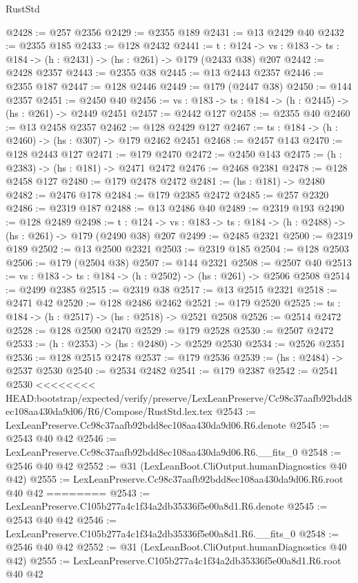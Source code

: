 \begin{lexlean}{RustStd}
\begin{coremodule}
{\begin{coremodule}
{{{{{@2428 := @257 @2356
@2429 := @2355 @189
@2431 := @13 @2429 @40
@2432 := @2355 @185
@2433 := @128 @2432
@2441 := {t : @124} ->
  {vs : @183} -> {ts : @184} -> (h : @2431) -> (hs : @261) -> @179 (@2433 @38) @207
@2442 := @2428 @2357
@2443 := @2355 @38
@2445 := @13 @2443 @2357
@2446 := @2355 @187
@2447 := @128 @2446
@2449 := @179 (@2447 @38)
@2450 := @144 @2357
@2451 := @2450 @40
@2456 := {vs : @183} -> {ts : @184} -> (h : @2445) -> (hs : @261) -> @2449 @2451
@2457 := @2442 @127
@2458 := @2355 @40
@2460 := @13 @2458 @2357
@2462 := @128 @2429 @127
@2467 := {ts : @184} -> (h : @2460) -> (hs : @307) -> @179 @2462 @2451
@2468 := @2457 @143
@2470 := @128 @2443 @127
@2471 := @179 @2470
@2472 := @2450 @143
@2475 := (h : @2383) -> (hs : @181) -> @2471 @2472
@2476 := @2468 @2381
@2478 := @128 @2458 @127
@2480 := @179 @2478 @2472
@2481 := (hs : @181) -> @2480
@2482 := @2476 @178
@2484 := @179 @2385 @2472
@2485 := @257 @2320
@2486 := @2319 @187
@2488 := @13 @2486 @40
@2489 := @2319 @193
@2490 := @128 @2489
@2498 := {t : @124} ->
  {vs : @183} -> {ts : @184} -> (h : @2488) -> (hs : @261) -> @179 (@2490 @38) @207
@2499 := @2485 @2321
@2500 := @2319 @189
@2502 := @13 @2500 @2321
@2503 := @2319 @185
@2504 := @128 @2503
@2506 := @179 (@2504 @38)
@2507 := @144 @2321
@2508 := @2507 @40
@2513 := {vs : @183} -> {ts : @184} -> (h : @2502) -> (hs : @261) -> @2506 @2508
@2514 := @2499 @2385
@2515 := @2319 @38
@2517 := @13 @2515 @2321
@2518 := @2471 @42
@2520 := @128 @2486 @2462
@2521 := @179 @2520
@2525 := {ts : @184} -> (h : @2517) -> (hs : @2518) -> @2521 @2508
@2526 := @2514 @2472
@2528 := @128 @2500 @2470
@2529 := @179 @2528
@2530 := @2507 @2472
@2533 := (h : @2353) -> (hs : @2480) -> @2529 @2530
@2534 := @2526 @2351
@2536 := @128 @2515 @2478
@2537 := @179 @2536
@2539 := (hs : @2484) -> @2537 @2530
@2540 := @2534 @2482
@2541 := @179 @2387
@2542 := @2541 @2530
<<<<<<<< HEAD:bootstrap/expected/verify/preserve/LexLeanPreserve/Cc98c37aafb92bdd8ec108aa430da9d06/R6/Compose/RustStd.lex.tex
@2543 := LexLeanPreserve.Cc98c37aafb92bdd8ec108aa430da9d06.R6.denote
@2545 := @2543 @40 @42
@2546 := LexLeanPreserve.Cc98c37aafb92bdd8ec108aa430da9d06.R6.__fits_0
@2548 := @2546 @40 @42
@2552 := @31 (LexLeanBoot.CliOutput.humanDiagnostics @40 @42)
@2555 := LexLeanPreserve.Cc98c37aafb92bdd8ec108aa430da9d06.R6.root @40 @42
========
@2543 := LexLeanPreserve.C105b277a4c1f34a2db35336f5e00a8d1.R6.denote
@2545 := @2543 @40 @42
@2546 := LexLeanPreserve.C105b277a4c1f34a2db35336f5e00a8d1.R6.__fits_0
@2548 := @2546 @40 @42
@2552 := @31 (LexLeanBoot.CliOutput.humanDiagnostics @40 @42)
@2555 := LexLeanPreserve.C105b277a4c1f34a2db35336f5e00a8d1.R6.root @40 @42
}}}}}
\end{coremodule}}
\end{coremodule}
\end{lexlean}
